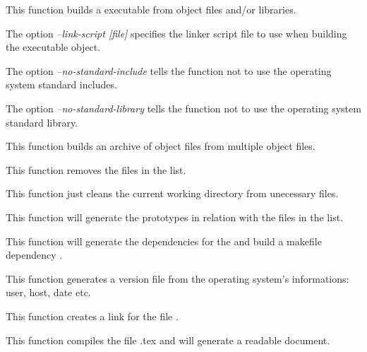          {
	   This function builds a executable from object files and/or
	   libraries.

	   The option \textit{--link-script [file]} specifies the
	   linker script file to use when building the executable object.

	   The option \textit{--no-standard-include} tells the function
	   not to use the operating system standard includes.

	   The option \textit{--no-standard-library} tells the function
	   not to use the operating system standard library.
	 }

         {
	   This function builds an archive of object files from multiple
	   object files.
	 }

         {
	   This function removes the files in the list.
	 }

         {
	   This function just cleans the current working directory from
	   unecessary files.
	 }

         {
	   This function will generate the prototypes in relation with
	   the files in the list.
	 }

         {
	   This function will generate the dependencies for the
	    and build a makefile dependency
	   .
	 }

         {
	   This function generates a version file from the operating
	   system's informations: user, host, date etc.
	 }

         {
	   This function creates a link  for the file
	   .
	 }

         {
	   This function compiles the file .tex and
	   will generate a readable document.
	 }

